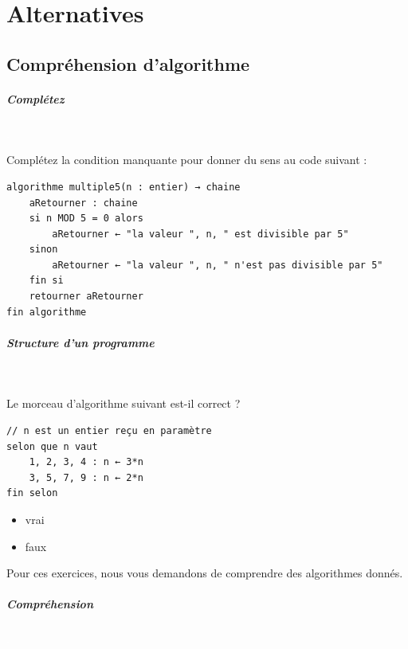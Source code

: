 \documentclass[11pt,a4paper]{article}
\begin{document}
            \section{Alternatives}\subsection{Compr\'ehension d'algorithme}
			
		\subparagraph{Compl\'etez} 
		
                \textcolor{white}{.} \par
            
								Compl\'etez la condition manquante pour donner du sens au code suivant :
							
            \par
        \begin{verbatim}
algorithme multiple5(n : entier) → chaine
    aRetourner : chaine
    si n MOD 5 = 0 alors
        aRetourner ← "la valeur ", n, " est divisible par 5"
    sinon
        aRetourner ← "la valeur ", n, " n'est pas divisible par 5"
    fin si
    retourner aRetourner
fin algorithme
\end{verbatim}
			
		\subparagraph{Structure d'un programme} 
		
                \textcolor{white}{.} \par
            Le morceau d'algorithme suivant est-il correct ?
					  \begin{verbatim}
// n est un entier reçu en paramètre
selon que n vaut
    1, 2, 3, 4 : n ← 3*n
    3, 5, 7, 9 : n ← 2*n
fin selon\end{verbatim}
            \begin{itemize} 
        
            \item[ \ding{"6D} ]  
							vrai
            
        
            \item[ \ding{"6D} ]  
							faux
            
        
            \end{itemize} 
        
          Pour ces exercices, nous vous demandons de comprendre des algorithmes donn\'es. 
        
            \par
        
			
		\subparagraph{Compr\'ehension} 
		
                \textcolor{white}{.} \par
            
\end{document}
